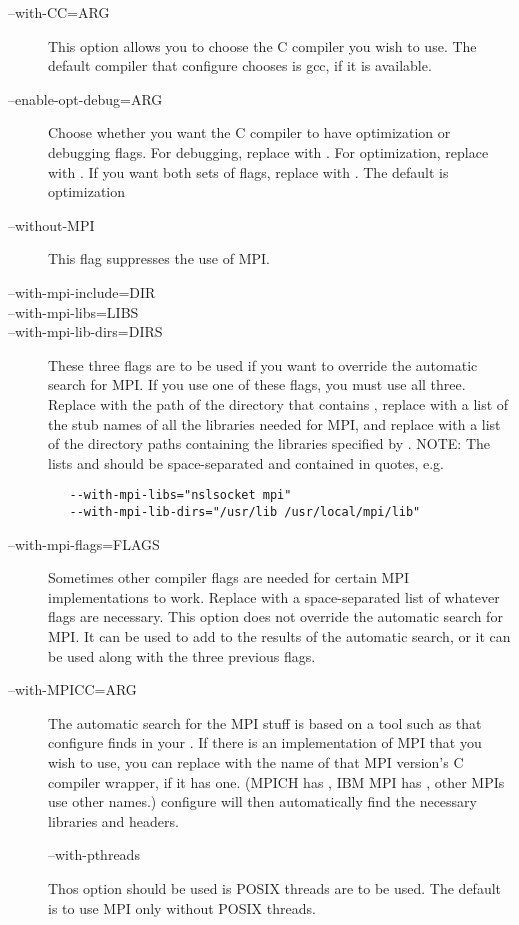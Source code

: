 \begin{description}

\item[--with-CC=ARG] This option allows you to choose the C compiler
you wish to use.  The default compiler that configure chooses is gcc,
if it is available.

\item[--enable-opt-debug=ARG] Choose whether you want the C compiler
to have optimization or debugging flags.  For debugging, replace
 with .  For optimization, replace  with
.  If you want both sets of flags, replace  with
.  The default is optimization

\item[--without-MPI] This flag suppresses the use of MPI.

\item[--with-mpi-include=DIR]
\item[--with-mpi-libs=LIBS]
\item[--with-mpi-lib-dirs=DIRS] These three flags are to be used if
you want to override the automatic search for MPI.  If you use one of
these flags, you must use all three.  Replace  with the path
of the directory that contains , replace  with a
list of the stub names of all the libraries needed for MPI, and
replace  with a list of the directory paths containing the
libraries specified by .  NOTE: The lists  and
 should be space-separated and contained in quotes, e.g.
\begin{verbatim}
   --with-mpi-libs="nslsocket mpi"
   --with-mpi-lib-dirs="/usr/lib /usr/local/mpi/lib"
\end{verbatim}

\item[--with-mpi-flags=FLAGS] Sometimes other compiler flags are
needed for certain MPI implementations to work.  Replace 
with a space-separated list of whatever flags are necessary.  This
option does not override the automatic search for MPI.  It can be used
to add to the results of the automatic search, or it can be used along
with the three previous flags.

\item[--with-MPICC=ARG] The automatic search for the MPI stuff is
based on a tool such as  that configure finds in your
.  If there is an implementation of MPI that you wish to
use, you can replace  with the name of that MPI version's C
compiler wrapper, if it has one.  (MPICH has , IBM MPI has
, other MPIs use other names.)  configure will then
automatically find the necessary libraries and headers.

--with-pthreads

Thos option should be used is POSIX threads are to be used.  The default
is to use MPI only without POSIX threads.

\end{description}

